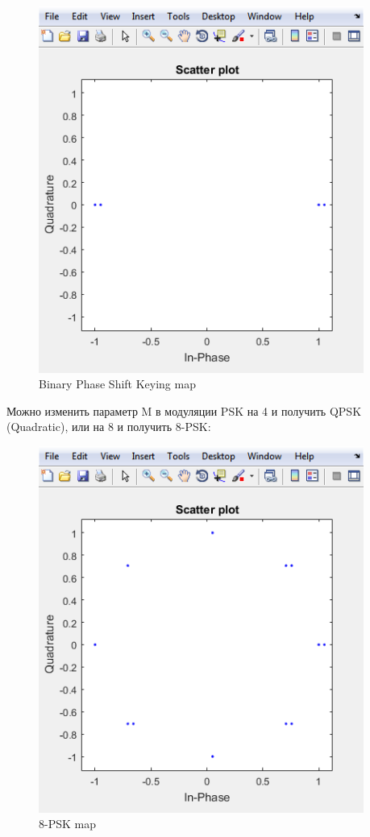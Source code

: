 \documentclass[a4paper,14pt]{extarticle}
\begin{document}
\begin{figure}[H]
\centering
\includegraphics[width=0.95\textwidth]{bpsk}
\captionsetup{justification=centering,margin=1.0 cm}
\caption{Binary Phase Shift Keying map}
\label{any}
\end{figure}

Можно изменить параметр M в модуляции PSK на 4 и получить QPSK (Quadratic), или на 8 и получить 8-PSK:

\begin{figure}[H]
\centering
\includegraphics[width=0.95\textwidth]{8psk}
\captionsetup{justification=centering,margin=1.0 cm}
\caption{8-PSK map}
\label{any}
\end{figure}
\end{document}
